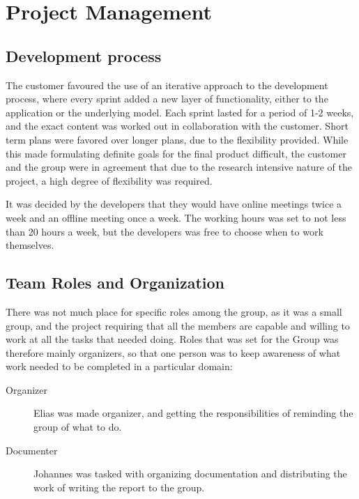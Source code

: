 \chapter{Project Management}
\section{Development process}

The customer favoured the use of an iterative approach to the development process, where every sprint added a new layer of functionality, either to the application or the underlying model. Each sprint lasted for a period of 1-2 weeks, and the exact content was worked out in collaboration with the customer. Short term plans were favored over longer plans, due to the flexibility provided. While this made formulating definite goals for the final product difficult, the customer and the group were in agreement that due to the research intensive nature of the project, a high degree of flexibility was required. 

It was decided by the developers that they would have online meetings twice a week and an offline meeting once a week. 
The working hours was set to not less than 20 hours a week, but the developers was free to choose when to work themselves.

\section{Team Roles and Organization}
There was not much place for specific roles among the group, as it was a small group, and the project requiring that all the members are capable and willing to work at all the tasks that needed doing. Roles that was set for the Group was therefore mainly organizers, so that one person was to keep awareness of what work needed to be completed in a particular domain:
\begin{description}

\item[Organizer] Elias was made organizer, and getting the responsibilities of reminding the group of what to do.
\item[Documenter] Johannes was tasked with organizing documentation and distributing the work of writing the report to the group. 
\end{description}
 
